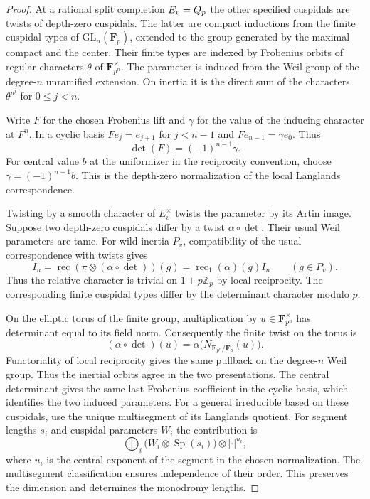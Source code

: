 \begin{proof}

At a rational split completion \(E_v=Q_p\) the other specified
cuspidals are twists of depth-zero cuspidals. The latter
are compact inductions from the finite cuspidal types of
\(\mathrm{GL}_n(\mathbf F_p)\), extended to the group generated
by the maximal compact and the center. Their finite types are
indexed by Frobenius orbits of regular characters \(\theta\) of
\(\mathbf F_{p^n}^{\times}\). The parameter is induced from the
Weil group of the degree-\(n\) unramified extension. On inertia
it is the direct sum of the characters \(\theta^{p^j}\) for
\(0\le j<n\).

Write \(F\) for the chosen Frobenius lift and \(\gamma\)
for the value of the inducing character at \(F^n\).
In a cyclic basis \(F e_j=e_{j+1}\) for \(j<n-1\)
and \(F e_{n-1}=\gamma e_0\). Thus
\[
        \det(F)=(-1)^{n-1}\gamma .
\]
For central value \(b\) at the uniformizer in the reciprocity
convention, choose \(\gamma=(-1)^{n-1}b\). This is the
depth-zero normalization of the local Langlands correspondence.
\hfill\mbox{\cite{adrian-roe}}


Twisting by a smooth character of \(E_v^{\times}\) twists the
parameter by its Artin image. Suppose two depth-zero cuspidals differ by a twist \(\alpha\circ\det\). Their usual Weil parameters are tame. For wild inertia \(P_v\), compatibility of the usual correspondence with twists gives
\[
 I_n=\operatorname{rec}(\pi\otimes(\alpha\circ\det))(g)
   =\operatorname{rec}_1(\alpha)(g)I_n\qquad(g\in P_v).
\]
Thus the relative character is trivial on \(1+p\mathbb Z_p\) by local reciprocity. \cite{henniart-local,adrian-roe} The corresponding
finite cuspidal types differ by the determinant character
modulo \(p\).

On the elliptic torus of the finite group, multiplication
by \(u\in\mathbf F_{p^n}^\times\) has determinant equal to
its field norm. Consequently the finite twist on the torus is
\[
       (\alpha\circ\det)(u)
          =\alpha\bigl(N_{\mathbf F_{p^n}/\mathbf F_p}(u)\bigr).
\]
Functoriality of local reciprocity gives the same pullback
on the degree-\(n\) Weil group. Thus the inertial orbits
agree in the two presentations. The central determinant gives
the same last Frobenius coefficient in the cyclic basis, which
identifies the two induced parameters.
For a general irreducible based on these cuspidals, use the unique multisegment of its Langlands quotient. For segment lengths \(s_i\) and cuspidal parameters \(W_i\) the contribution is
\[
 \bigoplus_i\bigl(W_i\otimes\operatorname{Sp}(s_i)\bigr)\otimes|\cdot|^{u_i},
\]
where \(u_i\) is the central exponent of the segment in the chosen normalization. The multisegment classification ensures independence of their order. \cite[\S9]{zelevinsky} This preserves the
dimension and determines the monodromy lengths.


\end{proof}
